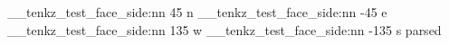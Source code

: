 \documentclass{standalone}
\begin{document}
\tenkzkernel
\ExplSyntaxOn
\__tenkz_test_face_side:nn {45} {n}
\__tenkz_test_face_side:nn {-45} {e}
\__tenkz_test_face_side:nn {135} {w}
\__tenkz_test_face_side:nn {-135} {s}
\ExplSyntaxOff
\mbox{parsed}
\end{document}
